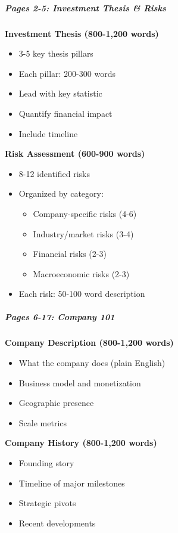 \documentclass[11pt]{article}
\begin{document}
\subparagraph{Pages 2-5: Investment Thesis \& Risks}\mbox{}\par

\textbf{Investment Thesis (800-1,200 words)}

\begin{itemize}[leftmargin=*,itemsep=2pt,topsep=2pt]
\item {} 3-5 key thesis pillars
\item {} Each pillar: 200-300 words
\item {} Lead with key statistic
\item {} Quantify financial impact
\item {} Include timeline
\end{itemize}

\textbf{Risk Assessment (600-900 words)}

\begin{itemize}[leftmargin=*,itemsep=2pt,topsep=2pt]
\item {} 8-12 identified risks
\item {} Organized by category:
\begin{itemize}[leftmargin=*,itemsep=2pt,topsep=2pt]
\item {} Company-specific risks (4-6)
\item {} Industry/market risks (3-4)
\item {} Financial risks (2-3)
\item {} Macroeconomic risks (2-3)
\end{itemize}
\item {} Each risk: 50-100 word description
\end{itemize}

\subparagraph{Pages 6-17: Company 101}\mbox{}\par

\textbf{Company Description (800-1,200 words)}

\begin{itemize}[leftmargin=*,itemsep=2pt,topsep=2pt]
\item {} What the company does (plain English)
\item {} Business model and monetization
\item {} Geographic presence
\item {} Scale metrics
\end{itemize}

\textbf{Company History (800-1,200 words)}

\begin{itemize}[leftmargin=*,itemsep=2pt,topsep=2pt]
\item {} Founding story
\item {} Timeline of major milestones
\item {} Strategic pivots
\item {} Recent developments
\end{itemize}
\end{document}
